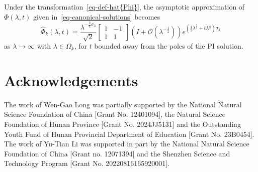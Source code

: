 \documentclass[12pt]{article}
\theoremstyle{plain}
\theoremstyle{definition}
\numberwithin{equation}{section}
\begin{document}
Under the transformation~\eqref{eq-def-hat{Phi}}, the asymptotic approximation of \( \Phi(\lambda, t) \) given in~\eqref{eq-canonical-solutions} becomes
\begin{equation}\label{eq-canonical-solutions-hat-Phi}
\widehat{\Phi}_{k}(\lambda,t)
=\frac{\lambda^{-\frac{3}{4}\sigma_{3}}}{\sqrt{2}}
\begin{bmatrix}1&-1\\1&1\end{bmatrix}
\left(I+\mathcal{O}(\lambda^{-\frac{1}{2}})\right)
e^{(\frac{4}{5}\lambda^{\frac{5}{2}}+t\lambda^{\frac{1}{2}})\sigma_{3}}
\end{equation}
as \( \lambda \to \infty \) with \( \lambda \in \Omega_{k} \), for \( t \) bounded away from the poles of the PI solution.










\section*{Acknowledgements}
The work of Wen-Gao Long was partially supported by the National Natural Science Foundation of China [Grant No. 12401094], the Natural Science Foundation of Hunan Province [Grant No. 2024JJ5131] and the Outstanding Youth Fund of Hunan Provincial Department of Education [Grant No. 23B0454]. The work of Yu-Tian Li was supported in part by the National Natural Science Foundation of China
[Grant no. 12071394] and the Shenzhen Science and Technology Program [Grant No. 20220816165920001].
\end{document}
